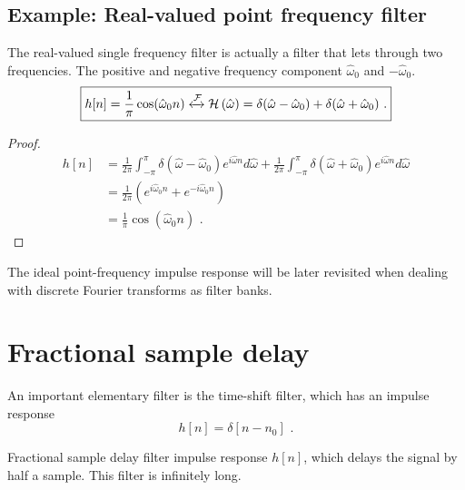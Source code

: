 \subsection{Example: Real-valued point frequency filter}

The real-valued single frequency filter is actually a filter that
lets through two frequencies. The positive and negative frequency
component $\hat{\omega}_0$ and $-\hat{\omega}_0$.
\begin{equation}
  \boxed{
    h[n] = \frac{1}{\pi}\cos(\hat{\omega}_0 n)  \xleftrightarrow{\mathcal{F}}  \mathcal{H}\left(\hat{\omega}\right) = \delta(\hat{\omega}-\hat{\omega}_0) + \delta(\hat{\omega}+\hat{\omega}_0)\,\,.
  }
\end{equation}
\begin{proof}
  \begin{align}
    h[n] & =\frac{1}{2\pi}\int_{-\pi}^{\pi} \delta(\hat{\omega}-\hat{\omega}_0) e^{i\hat{\omega}n} d\hat{\omega} + \frac{1}{2\pi}\int_{-\pi}^{\pi} \delta(\hat{\omega}+\hat{\omega}_0) e^{i\hat{\omega}n} d\hat{\omega} \\
         & = \frac{1}{2\pi} (e^{i\hat{\omega}_0 n}+e^{-i\hat{\omega}_0 n})                                                                                                                                              \\
         & = \frac{1}{\pi}\cos(\hat{\omega}_0 n)\,\,.
  \end{align}
\end{proof}
The ideal point-frequency impulse response will be later revisited
when dealing with discrete Fourier transforms as filter banks.

\section{Fractional sample delay}
An important elementary filter is the time-shift filter, which has an impulse response
\begin{equation}
  h[n] = \delta[n-n_0]\,\,.
\end{equation}
\begin{marginfigure}
  \begin{center}
  \end{center}
  \caption{Fractional sample delay filter impulse response $h[n]$, which delays the signal by half a sample. This filter is infinitely long.}
  \label{fig:frac_samp_delay_ex}
\end{marginfigure}

